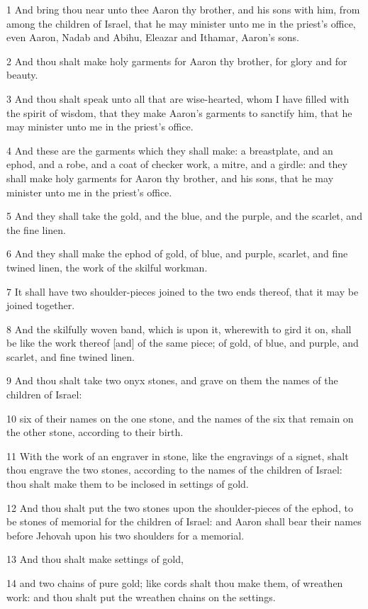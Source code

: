 \par 1 And bring thou near unto thee Aaron thy brother, and his sons with him, from among the children of Israel, that he may minister unto me in the priest's office, even Aaron, Nadab and Abihu, Eleazar and Ithamar, Aaron's sons.
\par 2 And thou shalt make holy garments for Aaron thy brother, for glory and for beauty.
\par 3 And thou shalt speak unto all that are wise-hearted, whom I have filled with the spirit of wisdom, that they make Aaron's garments to sanctify him, that he may minister unto me in the priest's office.
\par 4 And these are the garments which they shall make: a breastplate, and an ephod, and a robe, and a coat of checker work, a mitre, and a girdle: and they shall make holy garments for Aaron thy brother, and his sons, that he may minister unto me in the priest's office.
\par 5 And they shall take the gold, and the blue, and the purple, and the scarlet, and the fine linen.
\par 6 And they shall make the ephod of gold, of blue, and purple, scarlet, and fine twined linen, the work of the skilful workman.
\par 7 It shall have two shoulder-pieces joined to the two ends thereof, that it may be joined together.
\par 8 And the skilfully woven band, which is upon it, wherewith to gird it on, shall be like the work thereof [and] of the same piece; of gold, of blue, and purple, and scarlet, and fine twined linen.
\par 9 And thou shalt take two onyx stones, and grave on them the names of the children of Israel:
\par 10 six of their names on the one stone, and the names of the six that remain on the other stone, according to their birth.
\par 11 With the work of an engraver in stone, like the engravings of a signet, shalt thou engrave the two stones, according to the names of the children of Israel: thou shalt make them to be inclosed in settings of gold.
\par 12 And thou shalt put the two stones upon the shoulder-pieces of the ephod, to be stones of memorial for the children of Israel: and Aaron shall bear their names before Jehovah upon his two shoulders for a memorial.
\par 13 And thou shalt make settings of gold,
\par 14 and two chains of pure gold; like cords shalt thou make them, of wreathen work: and thou shalt put the wreathen chains on the settings.
